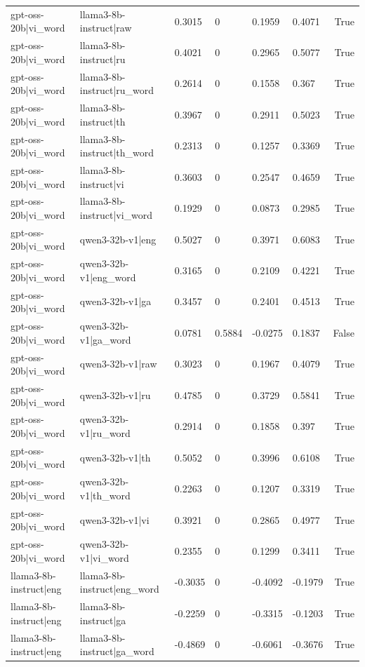 \begin{table}
\begin{tabular}{llllllr}
gpt-oss-20b|vi_word & llama3-8b-instruct|raw & 0.3015 & 0 & 0.1959 & 0.4071 & True \\
gpt-oss-20b|vi_word & llama3-8b-instruct|ru & 0.4021 & 0 & 0.2965 & 0.5077 & True \\
gpt-oss-20b|vi_word & llama3-8b-instruct|ru_word & 0.2614 & 0 & 0.1558 & 0.367 & True \\
gpt-oss-20b|vi_word & llama3-8b-instruct|th & 0.3967 & 0 & 0.2911 & 0.5023 & True \\
gpt-oss-20b|vi_word & llama3-8b-instruct|th_word & 0.2313 & 0 & 0.1257 & 0.3369 & True \\
gpt-oss-20b|vi_word & llama3-8b-instruct|vi & 0.3603 & 0 & 0.2547 & 0.4659 & True \\
gpt-oss-20b|vi_word & llama3-8b-instruct|vi_word & 0.1929 & 0 & 0.0873 & 0.2985 & True \\
gpt-oss-20b|vi_word & qwen3-32b-v1|eng & 0.5027 & 0 & 0.3971 & 0.6083 & True \\
gpt-oss-20b|vi_word & qwen3-32b-v1|eng_word & 0.3165 & 0 & 0.2109 & 0.4221 & True \\
gpt-oss-20b|vi_word & qwen3-32b-v1|ga & 0.3457 & 0 & 0.2401 & 0.4513 & True \\
gpt-oss-20b|vi_word & qwen3-32b-v1|ga_word & 0.0781 & 0.5884 & -0.0275 & 0.1837 & False \\
gpt-oss-20b|vi_word & qwen3-32b-v1|raw & 0.3023 & 0 & 0.1967 & 0.4079 & True \\
gpt-oss-20b|vi_word & qwen3-32b-v1|ru & 0.4785 & 0 & 0.3729 & 0.5841 & True \\
gpt-oss-20b|vi_word & qwen3-32b-v1|ru_word & 0.2914 & 0 & 0.1858 & 0.397 & True \\
gpt-oss-20b|vi_word & qwen3-32b-v1|th & 0.5052 & 0 & 0.3996 & 0.6108 & True \\
gpt-oss-20b|vi_word & qwen3-32b-v1|th_word & 0.2263 & 0 & 0.1207 & 0.3319 & True \\
gpt-oss-20b|vi_word & qwen3-32b-v1|vi & 0.3921 & 0 & 0.2865 & 0.4977 & True \\
gpt-oss-20b|vi_word & qwen3-32b-v1|vi_word & 0.2355 & 0 & 0.1299 & 0.3411 & True \\
llama3-8b-instruct|eng & llama3-8b-instruct|eng_word & -0.3035 & 0 & -0.4092 & -0.1979 & True \\
llama3-8b-instruct|eng & llama3-8b-instruct|ga & -0.2259 & 0 & -0.3315 & -0.1203 & True \\
llama3-8b-instruct|eng & llama3-8b-instruct|ga_word & -0.4869 & 0 & -0.6061 & -0.3676 & True \\

\end{tabular}
\end{table}
